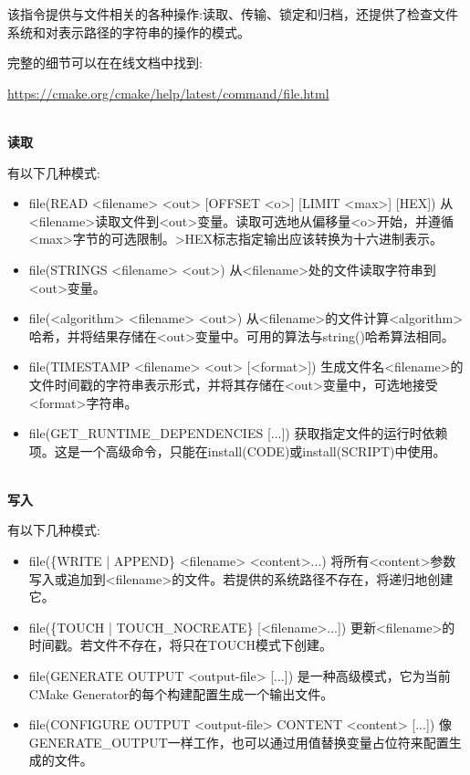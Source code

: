 该指令提供与文件相关的各种操作:读取、传输、锁定和归档，还提供了检查文件系统和对表示路径的字符串的操作的模式。

完整的细节可以在在线文档中找到:

\url{https://cmake.org/cmake/help/latest/command/file.html}

\hspace*{\fill} \\ %
\noindent
\textbf{读取}

有以下几种模式:

\begin{itemize}
\item 
file(READ <filename> <out> [OFFSET <o>] [LIMIT <max>] [HEX]) 从<filename>读取文件到<out>变量。读取可选地从偏移量<o>开始，并遵循<max>字节的可选限制。>HEX标志指定输出应该转换为十六进制表示。

\item 
file(STRINGS <filename> <out>) 从<filename>处的文件读取字符串到<out>变量。

\item 
file(<algorithm> <filename> <out>) 从<filename>的文件计算<algorithm>哈希，并将结果存储在<out>变量中。可用的算法与string()哈希算法相同。

\item 
file(TIMESTAMP <filename> <out> [<format>]) 生成文件名<filename>的文件时间戳的字符串表示形式，并将其存储在<out>变量中，可选地接受<format>字符串。

\item 
file(GET\_RUNTIME\_DEPENDENCIES [...]) 获取指定文件的运行时依赖项。这是一个高级命令，只能在install(CODE)或install(SCRIPT)中使用。
\end{itemize}


\hspace*{\fill} \\ %
\noindent
\textbf{写入}

有以下几种模式:

\begin{itemize}
\item 
file(\{WRITE | APPEND\} <filename> <content>...) 将所有<content>参数写入或追加到<filename>的文件。若提供的系统路径不存在，将递归地创建它。

\item 
file(\{TOUCH | TOUCH\_NOCREATE\} [<filename>...]) 更新<filename>的时间戳。若文件不存在，将只在TOUCH模式下创建。

\item 
file(GENERATE OUTPUT <output-file> [...]) 是一种高级模式，它为当前CMake Generator的每个构建配置生成一个输出文件。

\item 
file(CONFIGURE OUTPUT <output-file> CONTENT <content> [...]) 像GENERATE\_OUTPUT一样工作，也可以通过用值替换变量占位符来配置生成的文件。
\end{itemize}


